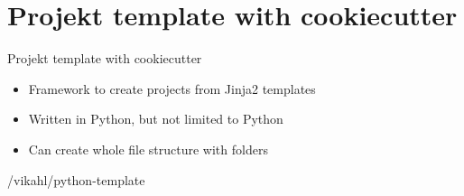\section{Projekt template with cookiecutter}

\begin{frame}{Projekt template with cookiecutter}
  \begin{itemize}
    \item Framework to create projects from Jinja2 templates
    \item Written in Python, but not limited to Python
    \item Can create whole file structure with folders
  \end{itemize}

  /vikahl/python-template
\end{frame}
